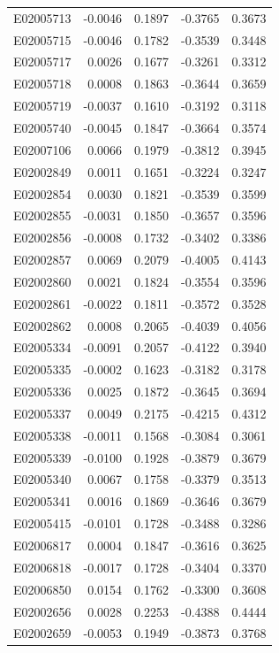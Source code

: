 \documentclass[11pt, a4paper]{article}
\begin{document}
\begin{longtable}{lrrrr}
E02005713 & -0.0046 & 0.1897 & -0.3765 & 0.3673 \\
E02005715 & -0.0046 & 0.1782 & -0.3539 & 0.3448 \\
E02005717 & 0.0026 & 0.1677 & -0.3261 & 0.3312 \\
E02005718 & 0.0008 & 0.1863 & -0.3644 & 0.3659 \\
E02005719 & -0.0037 & 0.1610 & -0.3192 & 0.3118 \\
E02005740 & -0.0045 & 0.1847 & -0.3664 & 0.3574 \\
E02007106 & 0.0066 & 0.1979 & -0.3812 & 0.3945 \\
E02002849 & 0.0011 & 0.1651 & -0.3224 & 0.3247 \\
E02002854 & 0.0030 & 0.1821 & -0.3539 & 0.3599 \\
E02002855 & -0.0031 & 0.1850 & -0.3657 & 0.3596 \\
E02002856 & -0.0008 & 0.1732 & -0.3402 & 0.3386 \\
E02002857 & 0.0069 & 0.2079 & -0.4005 & 0.4143 \\
E02002860 & 0.0021 & 0.1824 & -0.3554 & 0.3596 \\
E02002861 & -0.0022 & 0.1811 & -0.3572 & 0.3528 \\
E02002862 & 0.0008 & 0.2065 & -0.4039 & 0.4056 \\
E02005334 & -0.0091 & 0.2057 & -0.4122 & 0.3940 \\
E02005335 & -0.0002 & 0.1623 & -0.3182 & 0.3178 \\
E02005336 & 0.0025 & 0.1872 & -0.3645 & 0.3694 \\
E02005337 & 0.0049 & 0.2175 & -0.4215 & 0.4312 \\
E02005338 & -0.0011 & 0.1568 & -0.3084 & 0.3061 \\
E02005339 & -0.0100 & 0.1928 & -0.3879 & 0.3679 \\
E02005340 & 0.0067 & 0.1758 & -0.3379 & 0.3513 \\
E02005341 & 0.0016 & 0.1869 & -0.3646 & 0.3679 \\
E02005415 & -0.0101 & 0.1728 & -0.3488 & 0.3286 \\
E02006817 & 0.0004 & 0.1847 & -0.3616 & 0.3625 \\
E02006818 & -0.0017 & 0.1728 & -0.3404 & 0.3370 \\
E02006850 & 0.0154 & 0.1762 & -0.3300 & 0.3608 \\
E02002656 & 0.0028 & 0.2253 & -0.4388 & 0.4444 \\
E02002659 & -0.0053 & 0.1949 & -0.3873 & 0.3768 \\

\end{longtable}
\end{document}
